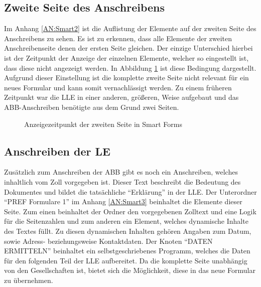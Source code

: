 	\subsection{Zweite Seite des Anschreibens}
	
	Im Anhang \ref{AN:Smart2} ist die Auflistung der Elemente auf der zweiten Seite des Anschreibens zu sehen. Es ist zu erkennen, dass alle Elemente der zweiten Anschreibenseite denen der ersten Seite gleichen. Der einzige Unterschied hierbei ist der Zeitpunkt der Anzeige der einzelnen Elemente, welcher so eingestellt ist, dass diese nicht angezeigt werden. In Abbildung \ref{beding_smart} ist diese Bedingung dargestellt. Aufgrund dieser Einstellung ist die komplette zweite Seite nicht relevant für ein neues Formular und kann somit vernachlässigt werden. Zu einem früheren Zeitpunkt war die \ac{LLE} in einer anderen, größeren, Weise aufgebaut und das \ac{ABB}-Anschreiben benötigte aus dem Grund zwei Seiten.
	
	\begin{figure}[ht]
		\centering
		\caption{Anzeigezeitpunkt der zweiten Seite in Smart Forms}
		\label{beding_smart}
	\end{figure}
	
	\subsection{Anschreiben der \acs{LE}}
	\label{ist:le}
	
	Zusätzlich zum Anschreiben der \ac{ABB} gibt es noch ein Anschreiben, welches inhaltlich vom Zoll vorgegeben ist. Dieser Text beschreibt die Bedeutung des Dokumentes und bildet die tatsächliche "`Erklärung"' in der \ac{LLE}. Der Unterordner "`PREF Formulare 1"' im Anhang \ref{AN:Smart3} beinhaltet die Elemente dieser Seite. Zum einen beinhaltet der Ordner den vorgegebenen Zolltext und eine Logik für die Seitenzahlen und zum anderen ein Element, welches dynamische Inhalte des Textes füllt. Zu diesen dynamischen Inhalten gehören Angaben zum Datum, sowie Adress- beziehungsweise Kontaktdaten. Der Knoten "`DATEN ERMITTELN"' beinhaltet ein selbstgeschriebenes Programm, welches die Daten für den folgenden Teil der \ac{LLE} aufbereitet. Da die komplette Seite unabhängig von den Gesellschaften ist, bietet sich die Möglichkeit, diese in das neue Formular zu übernehmen. 
	
